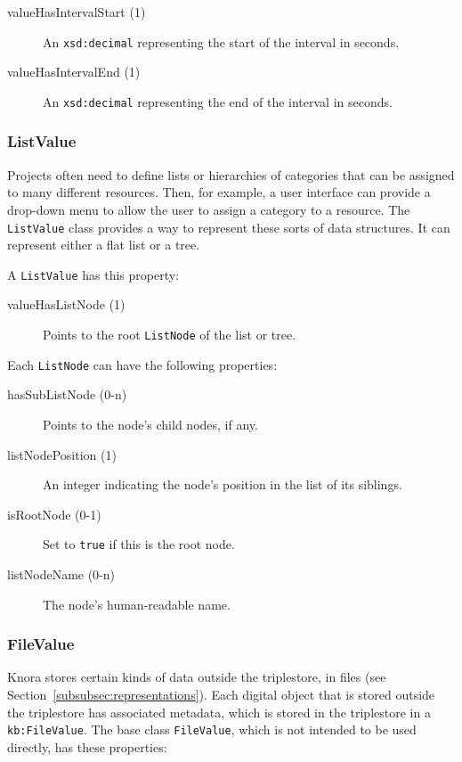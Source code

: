 \documentclass[12pt, a4paper]{article}
\begin{document}
\begin{description}
	\item[valueHasIntervalStart (1)] An \texttt{xsd:decimal} representing the start of the interval in seconds.
	\item[valueHasIntervalEnd (1)]	An \texttt{xsd:decimal} representing the end of the interval in seconds.
\end{description}

\subsubsection{ListValue}

Projects often need to define lists or hierarchies of categories that can be assigned to many different resources. Then, for example, a user interface can provide a drop-down menu to allow the user to assign a category to a resource. The \texttt{ListValue} class provides a way to represent these sorts of data structures. It can represent either a flat list or a tree.

A \texttt{ListValue} has this property:

\begin{description}
	\item[valueHasListNode (1)] Points to the root \texttt{ListNode} of the list or tree.
\end{description}

Each \texttt{ListNode} can have the following properties:

\begin{description}
	\item[hasSubListNode (0-n)] Points to the node's child nodes, if any.
	\item[listNodePosition (1)] An integer indicating the node's position in the list of its siblings.
	\item[isRootNode (0-1)] Set to \texttt{true} if this is the root node.
	\item[listNodeName (0-n)] The node's human-readable name.
\end{description}

\subsubsection{FileValue}

\label{subsubsec:filevalue}

Knora stores certain kinds of data outside the triplestore, in files (see Section~\ref{subsubsec:representations}). Each digital object that is stored outside the triplestore has associated metadata, which is stored in the triplestore in a \texttt{kb:FileValue}. The base class \texttt{FileValue}, which is not intended to be used directly, has these properties:
\end{document}
